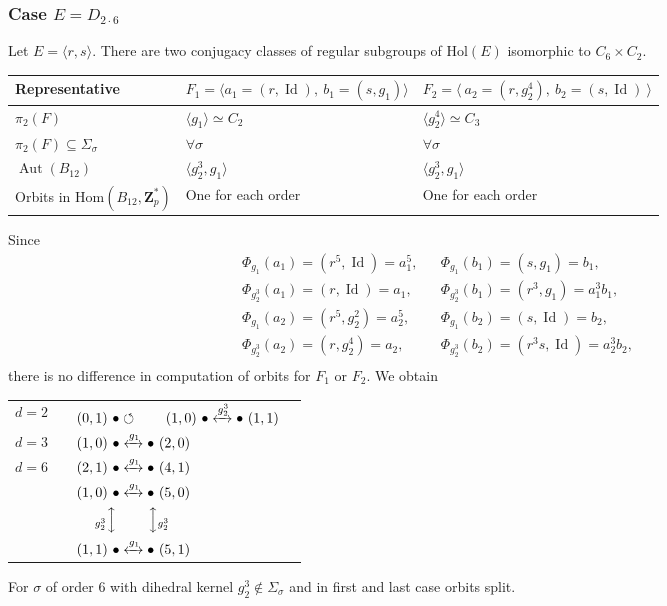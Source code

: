 \documentclass[12pt]{article}
\theoremstyle{definition}
\newcommand{\Z}{\mathbf Z}
\newcommand{\Hol}{\mathrm{Hol}}
\newcommand{\Hom}{\mathrm{Hom}}
\newcommand{\Aut}{\operatorname{Aut}}
\newcommand{\Id}{\operatorname{Id}}
\begin{document}
\subsubsection*{Case $E=D_{2\cdot 6}$}

Let $E=\langle r,s\rangle$. There are two conjugacy classes of regular subgroups of $\Hol(E)$ isomorphic to $C_6\times C_2$. 


\begin{center}
    \begin{tabular}{|l|l|l|}
    \hline
      Representative& $F_1=\langle a_1=(r,\Id),\ b_1=(s,g_1) \rangle$ & $F_2=\langle\  a_2=(r,g_2^4),\ b_2=(s,\Id) \ \rangle$ \\

      
      \hline
      $\pi_2(F)$ & $\langle g_1 \rangle\simeq C_2 $ &$\langle g_2^4\rangle\simeq C_3$\\
      $\pi_2(F)\subseteq \Sigma_{\sigma}$ & $\forall \sigma$ &
      $\forall \sigma$ \\
      $\Aut(B_{12})$ &$\langle g_2^3,g_1\rangle$ &$\langle g_2^3,g_1\rangle$ \\
      Orbits in $\Hom(B_{12},\Z_p^*)$ & One for each order & One for each order \\
      \hline
    \end{tabular}
\end{center}    

Since 
$$\begin{array}{lll}
\Phi_{g_1}(a_1)=(r^5,\Id)=a_1^5,& &  \Phi_{g_1}(b_1)=(s,g_1)=b_1, \\
\Phi_{g_2^3}(a_1)=(r,\Id)=a_1,& &  \Phi_{g_2^3}(b_1)=(r^3,g_1)=a_1^3 b_1,\\
\Phi_{g_1}(a_2)=(r^5,g_2^2)=a_2^5,& &  \Phi_{g_1}(b_2)=(s,\Id)=b_2, \\
\Phi_{g_2^3}(a_2)=(r,g_2^4)=a_2,& &  \Phi_{g_2^3}(b_2)=(r^3s,\Id)=a_2^3 b_2,\\
\end{array}
$$
there is no difference in computation of orbits for $F_1$ or $F_2$. We obtain
\begin{center}
	\begin{tabular}{lll l }
		$d=2$ &  &  $(0,1)\ \bullet \circlearrowleft\qquad (1,0)\ \bullet \xleftrightarrow{g_2^3}\bullet\  (1,1)$ \\[2ex]
		$d=3$& &  $(1,0)\ \bullet \xleftrightarrow{g_1}\bullet\  (2,0)$  \\[2ex]
		$d=6$ & & $ (2,1)\ \bullet \xleftrightarrow{g_1}\bullet\  (4,1)$  \\[2ex]
		& &  $(1,0)\ \bullet \xleftrightarrow{g_1}\bullet\   (5,0)$ \\
		&&$\quad\ {_{g_2^3}}\Big\updownarrow\qquad\  \Big\updownarrow {_{g_2^3}}$ & \\
		& &  $(1,1)\ \bullet \xleftrightarrow{g_1}\bullet\   (5,1)$ \\
	\end{tabular}
\end{center}
For $\sigma$ of order $6$ with dihedral kernel $g_2^3\not\in\Sigma_{\sigma}$ and in first and last case
orbits split.
\end{document}

